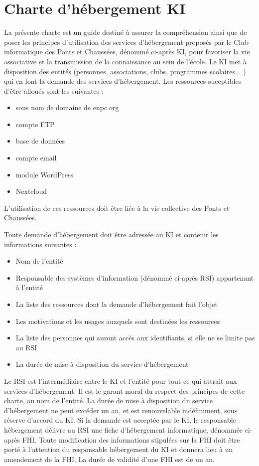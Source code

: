 \documentclass{ki019}
\begin{document}
\section{Charte d'hébergement KI}


La présente charte est un guide destiné à assurer la compréhension ainsi que de poser les principes d'utilisation des services d'hébergement proposés par le Club informatique des Ponts et Chaussées, dénommé ci-après KI, pour favoriser la vie associative et la transmission de la connaissance au sein de l'école. Le KI met à disposition des entités (personnes, associations, clubs, programmes scolaires... ) qui en font la demande des services d'hébergement. Les ressources suceptibles d'être alloués sont les suivantes :
\begin{itemize}
\item sous nom de domaine de enpc.org
\item compte FTP
\item base de données
\item compte email
\item module WordPress
\item Nextcloud
\end{itemize}

L'utilisation de ces ressources doit être liée à la vie collective des Ponts et Chaussées.



Toute demande d'hébergement doit être adressée au KI et contenir les informations suivantes :
\begin{itemize}
\item Nom de l'entité
\item Responsable des systèmes d'information (dénommé ci-après RSI) appartenant à l'entité
\item La liste des ressources dont la demande d'hébergement fait l'objet
\item Les motivations et les usages auxquels sont destinées les ressources
\item La liste des personnes qui auront accès aux identifiants, si elle ne se limite pas au RSI
\item La durée de mise à disposition du service d'hébergement
\end{itemize}

Le RSI est l'intermédiaire entre le KI et l'entité pour tout ce qui attrait aux services d'hébergement. Il est le garant moral du respect des principes de cette charte, au nom de l'entité. La durée de mise à disposition du service d'hébergement ne peut excéder un an, et est renouvelable indéfiniment, sous réserve d'accord du KI.
Si la demande est acceptée par le KI, le responsable hébergement délivre au RSI une fiche d'hébergement informatique, dénommée ci-après FHI. Toute modification des informations stipulées sur la FHI doit être porté à l'attention du responsable hébergement du KI et donnera lieu à un amendement de la FHI. La durée de validité d'une FHI est de un an.
\end{document}

